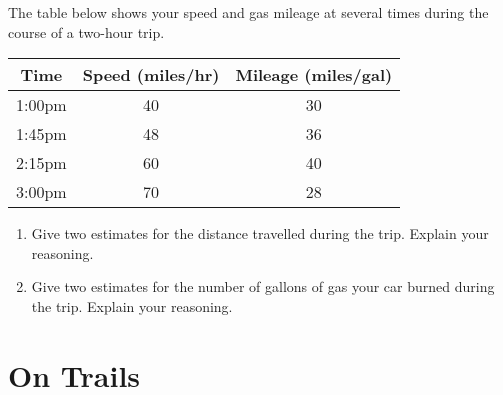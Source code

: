 \documentclass{ximera}
\begin{document}
\begin{exercise}  \label{EX:JJndre344adf}
The table below shows your speed and gas mileage at several times during the course of a two-hour trip.

\begin{tabular}{|c|c|c|}
\hline
Time & Speed (miles/hr) & Mileage (miles/gal) \\
\hline
1:00pm & 40 & 30 \\  \hline
1:45pm & 48 & 36 \\  \hline
2:15pm & 60 & 40 \\ \hline
3:00pm & 70 & 28 \\
\hline
\end{tabular}

\begin{enumerate}

\item Give two estimates for the distance travelled during the trip. Explain your reasoning.

\item Give two estimates for the number of gallons of gas your car burned during the trip. Explain your reasoning.

\end{enumerate}
\end{exercise}


\section{On Trails}
\end{document}
